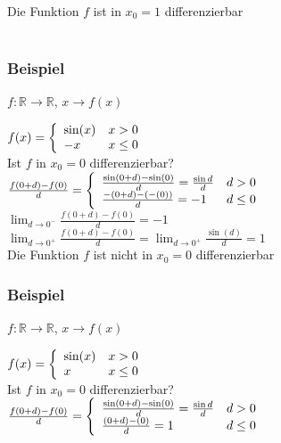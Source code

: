 \documentclass[11pt]{article} %
\begin{document}
Die Funktion $f$ ist in $x_0 = 1$ differenzierbar\\\\

\subsubsection{Beispiel}

$f: \mathbb{R} \rightarrow \mathbb{R}$, $x \rightarrow f(x)$

$f(x) = \left \{ 
\begin{array}{l  l}
	\sin(x) & x>0\\
	-x & x\leq 0\\
\end{array} \right.$ \\

Ist $f$ in $x_0 = 0$ differenzierbar?\\

$ \frac{f(0+d)-f(0)}{d} = \left \{ 
\begin{array}{l  l}
	\frac{\sin(0+d)-\sin(0)}{d} = \frac{\sin{d}}{d} & d>0\\
	\frac{-(0+d)-(-(0))}{d} = -1 & d\leq 0\\
\end{array} \right.$ \\

$\lim_{d \rightarrow 0^-} \frac{f(0+d)-f(0)}{d} = -1$\\
$\lim_{d \rightarrow 0^+} \frac{f(0+d)-f(0)}{d} = \lim_{d \rightarrow 0^+} \frac{\sin(d)}{d} =1$\\

Die Funktion $f$ ist nicht in $x_0=0$ differenzierbar

\subsubsection{Beispiel}

$f: \mathbb{R} \rightarrow \mathbb{R}$, $x \rightarrow f(x)$

$f(x) = \left \{ 
\begin{array}{l  l}
	\sin(x) & x>0\\
	x & x\leq 0\\
\end{array} \right.$ \\

Ist $f$ in $x_0 = 0$ differenzierbar?\\

$ \frac{f(0+d)-f(0)}{d} = \left \{ 
\begin{array}{l  l}
	\frac{\sin(0+d)-\sin(0)}{d} = \frac{\sin{d}}{d} & d>0\\
	\frac{(0+d)-(0)}{d} = 1 & d\leq 0\\
\end{array} \right.$ \\
\end{document}
